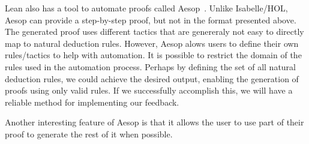 Lean also has a tool to automate proofs called Aesop~\cite{leanprovercommunity_2021_github}. Unlike Isabelle/HOL, Aesop can provide a step-by-step proof, but not in the format presented above. The generated proof uses different tactics that are genereraly not easy to directly map to natural deduction rules. However, Aesop alows users to define their own rules/tactics to help with automation. It is possible to restrict the domain of the rules used in the automation process. Perhaps by defining the set of all natural deduction rules, we could achieve the desired output, enabling the generation of proofs using only valid rules. If we successfully accomplish this, we will have a reliable method for implementing our feedback.

Another interesting feature of Aesop is that it allows the user to use part of their proof to generate the rest of it when possible.




